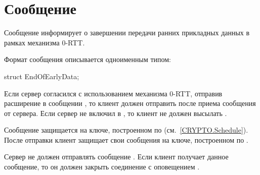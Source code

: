 \section{Сообщение }\label{HS.EOED}

Сообщение  информирует о завершении передачи ранних 
прикладных данных в рамках механизма 0-RTT.
   
Формат сообщения  описывается одноименным типом:
%
\begin{codeblock}
struct {} EndOfEarlyData;
\end{codeblock}

Если сервер согласился с использованием механизма 0-RTT, отправив расширение 
 в сообщении , 
то клиент должен отправить  после приема сообщения
 от сервера. 
%
Если сервер не включил  в 
, то клиент не должен высылать 
.

Сообщение  защищается на ключе, построенном по 
 (см.~\ref{CRYPTO.Schedule}). После отправки 
 клиент защищает свои сообщения на ключе, построенном по 
.

Сервер не должен отправлять сообщение .
Если клиент получает данное сообщение, то он должен закрыть соединение
с оповещением . 



